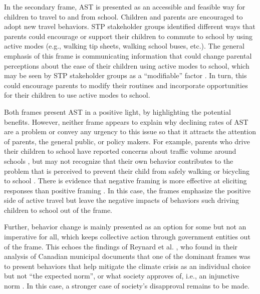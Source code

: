 \documentclass[preprint, 3p,
authoryear]{elsarticle} %
\begin{document}
In the secondary frame, AST is presented as an accessible and feasible
way for children to travel to and from school. Children and parents are
encouraged to adopt new travel behaviors. STP stakeholder groups
identified different ways that parents could encourage or support their
children to commute to school by using active modes (e.g., walking tip
sheets, walking school buses, etc.). The general emphasis of this frame
is communicating information that could change parental perceptions
about the ease of their children using active modes to school, which may
be seen by STP stakeholder groups as a ``modifiable'' factor
\citep[see][]{riaziCorrelatesChildrenIndependent2019}. In turn, this
could encourage parents to modify their routines and incorporate
opportunities for their children to use active modes to school.

Both frames present AST in a positive light, by highlighting the
potential benefits. However, neither frame appears to explain why
declining rates of AST are a problem or convey any urgency to this issue
so that it attracts the attention of parents, the general public, or
policy makers. For example, parents who drive their children to school
have reported concerns about traffic volume around schools
\citep{mammenUnderstandingDriveEscort2012}, but may not recognize that
their own behavior contributes to the problem that is perceived to
prevent their child from safely walking or bicycling to school
\citep{collinsSafeJourneysEnterprising2001, rothmanSchoolEnvironmentStudent2017}.
There is evidence that negative framing is more effective at eliciting
responses than positive framing
\citep[e.g.,][]{kahneman1979interpretation, waygoodCO2ValenceFraming2018}.
In this case, the frames emphasize the positive side of active travel
but leave the negative impacts of behaviors such driving children to
school out of the frame.

Further, behavior change is mainly presented as an option for some but
not an imperative for all, which keeps collective action through
government entities out of the frame. This echoes the findings of
Reynard et al. \citeyearpar{reynardGrowthResilienceHow2021}, who found
in their analysis of Canadian municipal documents that one of the
dominant frames was to present behaviors that help mitigate the climate
crisis as an individual choice but not ``the expected norm'', or what
society approves of, i.e., an injunctive norm
\citep{lapinski2005explication}. In this case, a stronger case of
society's disapproval remains to be made.
\end{document}
